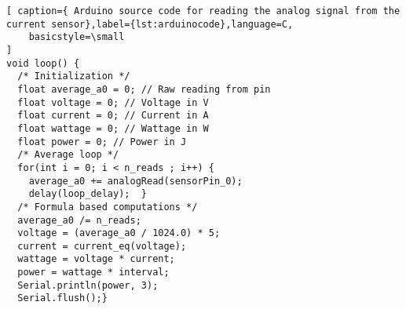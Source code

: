 \begin{lstlisting}[ caption={ Arduino source code for reading the analog signal from the current sensor},label={lst:arduinocode},language=C,
    basicstyle=\small
]
void loop() {
  /* Initialization */
  float average_a0 = 0; // Raw reading from pin
  float voltage = 0; // Voltage in V
  float current = 0; // Current in A
  float wattage = 0; // Wattage in W
  float power = 0; // Power in J
  /* Average loop */
  for(int i = 0; i < n_reads ; i++) {
    average_a0 += analogRead(sensorPin_0);
    delay(loop_delay);  }
  /* Formula based computations */
  average_a0 /= n_reads;
  voltage = (average_a0 / 1024.0) * 5;
  current = current_eq(voltage);
  wattage = voltage * current;
  power = wattage * interval;
  Serial.println(power, 3);
  Serial.flush();}

\end{lstlisting}
